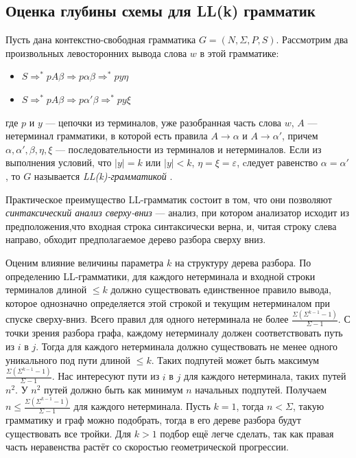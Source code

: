 \documentclass{spbau-diploma}
\begin{document}
\subsection{Оценка глубины схемы для LL(k) грамматик} 
Пусть дана контекстно-свободная грамматика  $G = (N, \Sigma, P, S)$. Рассмотрим два произвольных левосторонних вывода слова $w$ в этой грамматике:
\begin{itemize}
	\item $S \Rightarrow^* pA\beta \Rightarrow p \alpha \beta  \Rightarrow^*  py \eta$ 
	\item $S \Rightarrow^* pA\beta \Rightarrow p \alpha' \beta  \Rightarrow^*  py \xi$ 
\end{itemize}
где $p$ и $y$ --- цепочки из терминалов, уже разобранная часть слова $w$, $A$ --- нетерминал грамматики, в которой есть правила $A \rightarrow \alpha$ и $A \rightarrow \alpha'$, причем $\alpha, \alpha', \beta, \eta, \xi$ --- последовательности из терминалов и нетерминалов. Если из выполнения условий, что $|y| = k$ или $|y| < k$, $\eta = \xi = \varepsilon$, cледует равенство $\alpha = \alpha'$, то $G$ называется \textit{LL(k)-грамматикой} \cite{LL}.
\par
Практическое  преимущество  LL-грамматик состоит в том, что они позволяют \textit{синтаксический анализ сверху-вниз} --- анализ, при котором анализатор исходит из предположения,что входная строка синтаксически верна, и, читая строку слева направо, обходит предполагаемое дерево разбора сверху вниз.\par
Оценим влияние величины параметра $k$ на структуру дерева разбора. По определению LL-грамматики, для каждого нетерминала и входной строки терминалов длиной $\le k$ должно существовать единственное правило вывода, которое однозначно определяется этой строкой и текущим нетерминалом при спуске сверху-вниз. Всего правил для одного нетерминала не более $\frac{\Sigma(\Sigma^{k-1} - 1)}{\Sigma -1}$. С точки зрения разбора графа, каждому нетерминалу должен соответствовать путь из $i$ в $j$. Тогда для каждого нетерминала должно существовать не менее одного уникального под пути длиной $\le k$. Таких подпутей может быть максимум $\frac{\Sigma(\Sigma^{k-1} - 1)}{\Sigma -1}$.  Нас интересуют пути из $i$ в $j$ для каждого нетерминала, таких путей $n^2$. У $n^2$ путей должно быть как минимум $n$ начальных подпутей. Получаем $n \le \frac{\Sigma(\Sigma^{k-1} - 1)}{\Sigma -1}$ для каждого нетерминала. Пусть $k = 1$, тогда $n < \Sigma$, такую грамматику и граф можно подобрать, тогда в его дереве разбора будут существовать все тройки. Для $k > 1$ подбор ещё легче сделать, так как правая часть неравенства растёт со скоростью геометрической прогрессии. \par
\end{document}
